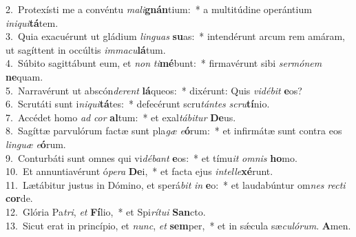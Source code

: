 {2.~}Protexísti me a convéntu \textit{ma}\textit{li}\textbf{gnán}tium:~* a multitúdine operántium \textit{i}\textit{ni}\textit{qui}\textbf{tá}tem.\\
{3.~}Quia exacuérunt ut gládium \textit{lin}\textit{guas} \textbf{su}as:~* intendérunt arcum rem amáram, ut sagíttent in occúltis \textit{im}\textit{ma}\textit{cu}\textbf{lá}tum.\\
{4.~}Súbito sagittábunt eum, et \textit{non} \textit{ti}\textbf{mé}bunt:~* firmavérunt sibi \textit{ser}\textit{mó}\textit{nem} \textbf{ne}quam.\\
{5.~}Narravérunt ut abscón\textit{de}\textit{rent} \textbf{lá}queos:~* dixérunt: Quis \textit{vi}\textit{dé}\textit{bit} \textbf{e}os?\\
{6.~}Scrutáti sunt i\textit{ni}\textit{qui}\textbf{tá}tes:~* defecérunt scru\textit{tán}\textit{tes} \textit{scru}\textbf{tí}nio.\\
{7.~}Accédet homo \textit{ad} \textit{cor} \textbf{al}tum:~* et exal\textit{tá}\textit{bi}\textit{tur} \textbf{De}us.\\
{8.~}Sagíttæ parvulórum factæ sunt pla\textit{gæ} \textit{e}\textbf{ó}rum:~* et infirmátæ sunt contra eos \textit{lin}\textit{guæ} \textit{e}\textbf{ó}rum.\\
{9.~}Conturbáti sunt omnes qui vi\textit{dé}\textit{bant} \textbf{e}os:~* et tímu\textit{it} \textit{om}\textit{nis} \textbf{ho}mo.\\
{10.~}Et annuntiavérunt ó\textit{pe}\textit{ra} \textbf{De}i,~* et facta ejus \textit{in}\textit{tel}\textit{le}\textbf{xé}runt.\\
{11.~}Lætábitur justus in Dómino, et sperá\textit{bit} \textit{in} \textbf{e}o:~* et laudabúntur om\textit{nes} \textit{re}\textit{cti} \textbf{cor}de.\\
{12.~}Glória Pa\textit{tri}, \textit{et} \textbf{Fí}lio,~* et Spi\textit{rí}\textit{tu}\textit{i} \textbf{San}cto.\\
{13.~}Sicut erat in princípio, et \textit{nunc}, \textit{et} \textbf{sem}per,~* et in sǽcula sæ\textit{cu}\textit{ló}\textit{rum}. \textbf{A}men.\\
